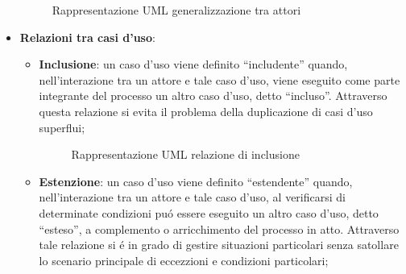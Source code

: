 \begin{itemize}
        \begin{figure}[ht!]
            \centering
            \caption{Rappresentazione UML generalizzazione tra attori}
            \label{fig:Rappresentazione UML generalizzazione tra attori}
        \end{figure}
    \item \textbf{Relazioni tra casi d'uso}: 
        \begin{itemize}
        \item \textbf{Inclusione}: un caso d'uso viene definito ``includente'' quando, nell'interazione tra un attore e tale caso d'uso, viene eseguito come parte integrante del processo un altro caso d'uso, detto ``incluso''. Attraverso questa relazione si evita il problema della duplicazione di casi d'uso superflui; 
            \begin{figure}[ht!]
                \centering
                \caption{Rappresentazione UML relazione di inclusione}
                \label{fig:Rappresentazione UML relazione di inclusione}
            \end{figure}
        \item \textbf{Estenzione}: un caso d'uso viene definito ``estendente'' quando, nell'interazione tra un attore e tale caso d'uso, al verificarsi di determinate condizioni puó essere eseguito un altro caso d'uso, detto ``esteso'', a complemento o arricchimento del processo in atto. Attraverso tale relazione si é in grado di gestire situazioni particolari senza satollare lo scenario principale di eccezzioni e condizioni particolari;

\end{itemize}
\end{itemize}
